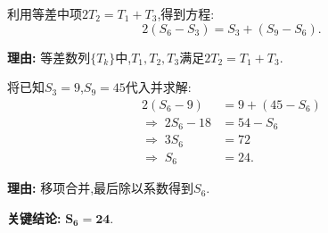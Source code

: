 \begin{examplebox}
\begin{description}[style=nextline, leftmargin=2.8em, labelsep=0.5em, itemsep=0.45em]
		\item[\textbf{第二步(列等差中项方程):}] 利用等差中项$2T_2 = T_1 + T_3$,得到方程:
			\[
				2(S_6 - S_3) = S_3 + (S_9 - S_6).
			\]
			\par\textbf{理由:} 等差数列$\{T_k\}$中,$T_1,T_2,T_3$满足$2T_2 = T_1 + T_3$.

		\item[\textbf{第三步(解方程得结果):}] 将已知$S_3=9$,$S_9=45$代入并求解:
			\[
				\begin{aligned}
					2(S_6 - 9) &= 9 + (45 - S_6) \\
					\Rightarrow\; 2S_6 - 18 &= 54 - S_6 \\
					\Rightarrow\; 3S_6 &= 72 \\
					\Rightarrow\; S_6 &= 24.
			\end{aligned}
			\]
			\par\textbf{理由:} 移项合并,最后除以系数得到$S_6$.
	\end{description}

	\textbf{\textcolor{CExample}{关键结论:}}
	$\boldsymbol{S_6 = 24}$.

\end{examplebox}
